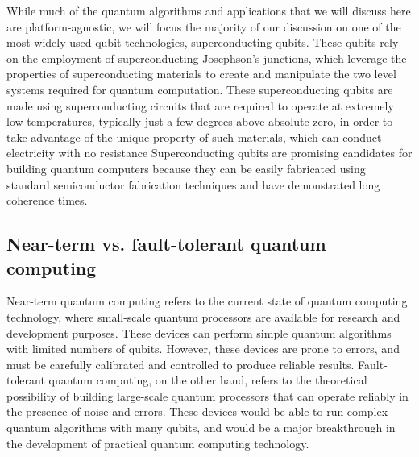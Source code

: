 \documentclass{article}
\begin{document}
While much of the quantum algorithms and applications that we will discuss here are platform-agnostic, we will focus the majority of our discussion on one of the most widely used qubit technologies, superconducting qubits. These qubits rely on the employment of superconducting Josephson's junctions, which leverage the properties of superconducting materials to create and manipulate the two level systems required for quantum computation.
These superconducting qubits are made using superconducting circuits \cite{bravyi2022future, martinis2021optimal, chamberland2022building} that are required to operate at extremely low temperatures, typically just a few degrees above absolute zero, in order to take advantage of the unique property of such materials, which can conduct electricity with no resistance Superconducting qubits are promising candidates for building quantum computers because they can be easily fabricated using standard semiconductor fabrication techniques and have demonstrated long coherence times. 



\subsection{Near-term vs. fault-tolerant quantum computing}
Near-term quantum computing refers to the current state of quantum computing technology, where small-scale quantum processors are available for research and development purposes. These devices can perform simple quantum algorithms with limited numbers of qubits.  However, these devices are prone to errors, and must be carefully calibrated and controlled to produce reliable results. Fault-tolerant quantum computing, on the other hand, refers to the theoretical possibility of building large-scale quantum processors that can operate reliably in the presence of noise and errors. These devices would be able to run complex quantum algorithms with many qubits, and would be a major breakthrough in the development of practical quantum computing technology.
\end{document}
